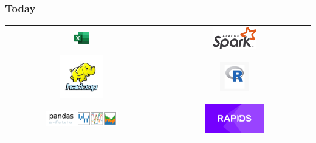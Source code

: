\documentclass{beamer}
\begin{document}
\begin{frame}
   \frametitle{Today}
   \begin{tabular}{cc}
      \includegraphics[width=0.1\textwidth]{images/2000px-Microsoft_Office_Excel_2018_present.png} &
      \includegraphics[width=0.3\textwidth]{images/Apache_Spark_logo.png} \\
      \includegraphics[width=0.3\textwidth]{images/hadoop_logo.jpeg} &
      \includegraphics[width=0.2\textwidth]{images/r_logo.jpg} \\
      \includegraphics[width=0.5\textwidth]{images/pandas_logo.png} &
      \includegraphics[width=0.4\textwidth]{images/rapids_logo.png}
   \end{tabular}
\end{frame}
\end{document}
